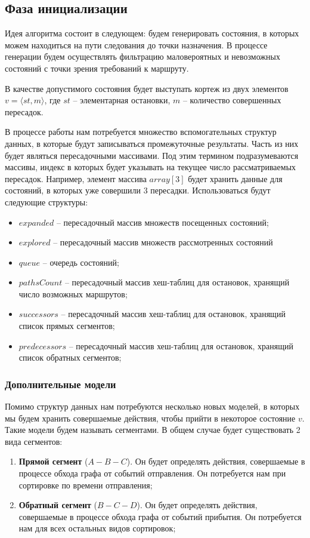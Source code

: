 \subsection{Фаза инициализации}
Идея алгоритма состоит в следующем: будем генерировать состояния, в которых можем находиться на пути следования до точки назначения. В процессе генерации будем осуществлять фильтрацию маловероятных и невозможных состояний с точки зрения требований к маршруту.

В качестве допустимого состояния будет выступать кортеж из двух элементов $v=\langle st, m \rangle$, где $st$ -- элементарная остановки, $m$ -- количество совершенных пересадок. 

В процессе работы нам потребуется множество вспомогательных структур данных, в которые будут записываться промежуточные результаты. Часть из них будет являться пересадочными массивами. Под этим термином подразумеваются массивы, индекс в которых будет указывать на текущее число рассматриваемых пересадок. Например, элемент массива $array[3]$ будет хранить данные для состояний, в которых уже совершили 3 пересадки. Использоваться будут следующие структуры:

\begin{itemize}
	\item $expanded$ -- пересадочный массив множеств посещенных состояний;
	\item $explored$ -- пересадочный массив множеств рассмотренных состояний
	\item $queue$ -- очередь состояний;
	\item $pathsCount$ -- пересадочный массив хеш-таблиц для остановок, хранящий число возможных маршрутов;
	\item $successors$ -- пересадочный массив хеш-таблиц для остановок, хранящий список прямых сегментов;
	\item $predecessors$ -- пересадочный массив хеш-таблиц для остановок, хранящий список обратных сегментов;
\end{itemize}

\subsubsection{Дополнительные модели}
Помимо структур данных нам потребуются несколько новых моделей, в которых мы будем хранить совершаемые действия, чтобы прийти в некоторое состояние $v$. Такие модели будем называть сегментами. В общем случае будет существовать 2 вида сегментов:
\begin{enumerate}
	\item \textbf{Прямой сегмент} ($A-B-C$). Он будет определять действия, совершаемые в процессе обхода графа от событий отправления. Он потребуется нам при сортировке по времени отправления;
	\item \textbf{Обратный сегмент} ($B-C-D$). Он будет определять действия, совершаемые в процессе обхода графа от событий прибытия. Он потребуется нам для всех остальных видов сортировок;
\end{enumerate}

